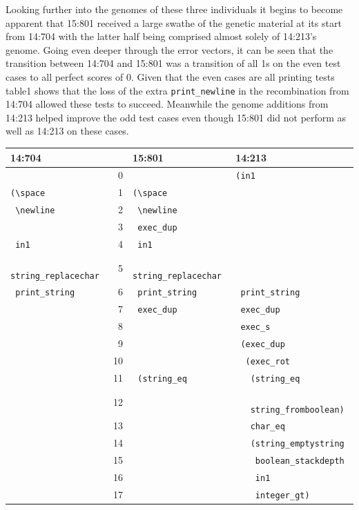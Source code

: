 Looking further into the genomes of these three individuals it begins to become apparent that
15:801 received a large swathe of the genetic material at its start from 14:704 with the latter
half being comprised almost solely of 14:213's genome. Going even deeper through the error vectors,
it can be seen that the transition between 14:704 and 15:801 was a transition of all 1s on the even
test cases to all perfect scores of 0. Given that the even cases are all printing tests table1 shows
that the loss of the extra \texttt{print\_newline} in the recombination from 14:704 allowed these
tests to succeed. Meanwhile the genome additions from 14:213 helped improve the odd test cases even
though 15:801 did not perform as well as 14:213 on these cases.


\begin{table}
	\begin{tabular}{l|rl|l}
		\textbf{14:704} & & \textbf{15:801} & \textbf{14:213} \\
		\hline
		& 0 & & \texttt{(in1} \\ 
		\texttt{(\textbackslash space} & 1 & \texttt{(\textbackslash space} & \\ 
		\texttt{ \textbackslash newline} & 2 & \texttt{ \textbackslash newline} &  \\ 
		& 3 & \texttt{ exec\_dup} &  \\ 
		\texttt{ in1} & 4 & \texttt{ in1} &  \\ 
		\texttt{ string\_replacechar} & 5 & \texttt{ string\_replacechar} &  \\ 
		\texttt{ print\_string} & 6 & \texttt{ print\_string} & \texttt{ print\_string} \\ 
		& 7 & \texttt{ exec\_dup} & \texttt{ exec\_dup} \\ 
		& 8 &  & \texttt{ exec\_s} \\ 
		& 9 &  & \texttt{ (exec\_dup} \\ 
		& 10 &  & \texttt{ \ (exec\_rot} \\ 
		& 11 & \texttt{ (string\_eq} & \texttt{ \ \ (string\_eq} \\
		& 12 & &  \texttt{ \ \ \ string\_fromboolean)} \\ 
		& 13 &  & \texttt{ \ \ char\_eq} \\ 
		& 14 & & \texttt{ \ \ (string\_emptystring} \\
		& 15 & &  \texttt{ \ \ \ boolean\_stackdepth} \\
		& 16 & & \texttt{ \ \ \ in1} \\
		& 17 & & \texttt{ \ \ \ integer\_gt)} \\ 

\end{tabular}
\end{table}
